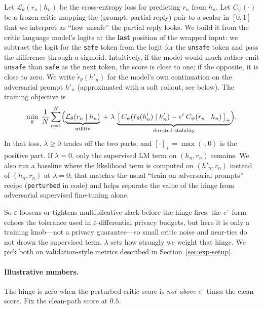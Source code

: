 \documentclass{article}
\begin{document}
Let $\mathcal{L}_\theta(r_n\mid h_n)$ be the cross-entropy loss for predicting $r_n$ from $h_n$. Let $C_\psi(\cdot)$ be a frozen critic mapping the (prompt, partial reply) pair to a scalar in $[0,1]$ that we interpret as ``how unsafe'' the partial reply looks. We build it from the critic language model's logits at the \textbf{last} position of the wrapped input: we subtract the logit for the \texttt{safe} token from the logit for the \texttt{unsafe} token and pass the difference through a sigmoid. Intuitively, if the model would much rather emit \texttt{unsafe} than \texttt{safe} as the next token, the score is close to one; if the opposite, it is close to zero. We write $\tilde{r}_\theta(h'_n)$ for the model's own continuation on the adversarial prompt $h'_n$ (approximated with a soft rollout; see below). The training objective is
\begin{equation}
\label{eq:loss}
\min_{\theta}\;\frac{1}{N}\sum_{n=1}^{N}\Bigl(
\underbrace{\mathcal{L}_\theta(r_n\mid h_n)}_{\text{utility}}
\;+\;\lambda\,
\underbrace{\bigl[\,C_\psi(\tilde{r}_\theta(h'_n)\mid h'_n)
- e^{\varepsilon}\,C_\psi(r_n\mid h_n)\,\bigr]_{+}}_{\text{directed stability}}
\Bigr),
\end{equation}
In that loss, $\lambda\ge0$ trades off the two parts, and $[\cdot]_+=\max(\cdot,0)$ is the positive part. If $\lambda{=}0$, only the supervised LM term on $(h_n,r_n)$ remains. We also run a baseline where the likelihood term is computed on $(h'_n,r_n)$ instead of $(h_n,r_n)$ at $\lambda{=}0$; that matches the usual ``train on adversarial prompts'' recipe (\texttt{perturbed} in code) and helps separate the value of the hinge from adversarial supervised fine-tuning alone.

So $\varepsilon$ loosens or tightens multiplicative slack before the hinge fires; the $e^\varepsilon$ form echoes the tolerance used in $\varepsilon$-differential privacy budgets, but here it is only a training knob---not a privacy guarantee---so small critic noise and near-ties do not drown the supervised term. $\lambda$ sets how strongly we weight that hinge. We pick both on validation-style metrics described in Section~\ref{sec:exp-setup}.

\paragraph{Illustrative numbers.} The hinge is zero when the perturbed critic score is \emph{not above} $e^{\varepsilon}$ times the clean score. Fix the clean-path score at $0.5$.
\end{document}

